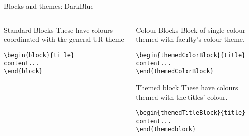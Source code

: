 \begingroup
{}
\begin{frame}[fragile]{Blocks and themes: DarkBlue}
\begin{columns} %
\begin{column}{0.3\textwidth}
\begin{block}{Standard Blocks}
These have colours coordinated with the general UR theme
\begin{verbatim}
\begin{block}{title}
content...
\end{block}
\end{verbatim}
\end{block}
\end{column}
\begin{column}{0.7\textwidth}
\begin{themedColorBlock}{Colour Blocks}
Block of single colour themed with faculty's colour theme.
\small
\begin{verbatim}
\begin{themedColorBlock}{title}
content...
\end{themedColorBlock}
\end{verbatim}
\end{themedColorBlock}
\begin{themedTitleBlock} {Themed block}
These have colours themed with the titles' colour.
\small
\begin{verbatim}
\begin{themedTitleBlock}{title}
content...
\end{themedblock}
\end{verbatim}
\end{themedTitleBlock}
\end{column}
\end{columns}
\end{frame}
\endgroup



